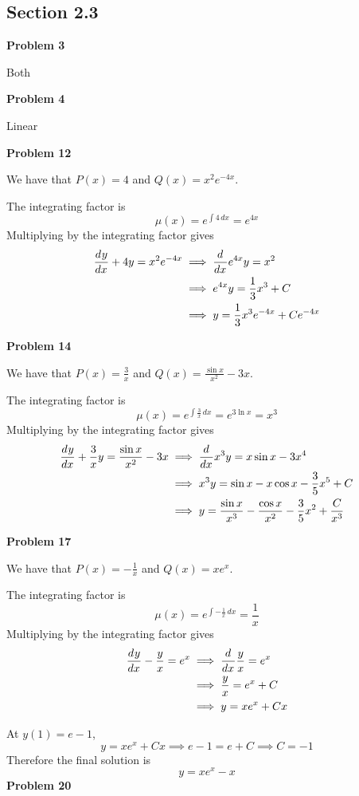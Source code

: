 \subsection*{Section 2.3}
\textbf{Problem 3}

Both

\textbf{Problem 4}

Linear

\textbf{Problem 12}

We have that 
$P(x) = 4$ and
$Q(x) = x^2e^{-4x}$.

The integrating factor is 
\[
    \mu(x)
    = e^{\int 4 \,dx}
    = e^{4x}
\]
Multiplying by the integrating factor gives 
\begin{align*}
    \frac{d^{} y}{d x^{}} + 4y = x^2e^{-4x}
    &\implies \frac{d^{} }{d x^{}} e^{4x}y = x^2 \\
    &\implies e^{4x}y = \frac{1}{3} x^3 + C \\ 
    &\implies y = \frac{1}{3} x^3e^{-4x} + Ce^{-4x}
\end{align*}

\textbf{Problem 14}

We have that 
$P(x) = \frac{3}{x}$ and 
$Q(x) = \frac{\sin x}{x^2} - 3x$.

The integrating factor is 
\[
    \mu(x)
    = e^{\int \frac{3}{x} \,dx}
    = e^{3\ln x}
    = x^3
\]
Multiplying by the integrating factor gives 
\begin{align*}
    \frac{d^{} y}{d x^{}} + \frac{3}{x}y = \frac{\sin x}{x^2} - 3x
    &\implies \frac{d^{} }{d x^{}} x^3y = x \sin x - 3x^4 \\ 
    &\implies x^3y = \sin x - x \cos x - \frac{3}{5}x^5 + C \\
    &\implies y = \frac{\sin x}{x^3} - \frac{\cos x}{x^2} - \frac{3}{5}x^2 + \frac{C}{x^3}
\end{align*}

\textbf{Problem 17}

We have that 
$P(x) = -\frac{1}{x}$ and
$Q(x) = xe^x$.

The integrating factor is 
\[
    \mu(x)
    = e^{\int -\frac{1}{x} \,dx}
    = \frac{1}{x}
\]
Multiplying by the integrating factor gives 
\begin{align*}
    \frac{d^{} y}{d x^{}} - \frac{y}{x} = e^x
    &\implies \frac{d^{} }{d x^{}} \frac{y}{x} = e^x \\
    &\implies \frac{y}{x} = e^x + C\\
    &\implies y = xe^x + Cx
\end{align*}

At $y(1) = e-1$,
\[
    y = xe^x + Cx
    \implies e-1 = e + C
    \implies C = -1
\]
Therefore the final solution is 
\[
    y = xe^x - x
\]
\textbf{Problem 20}

